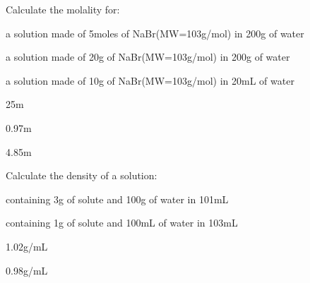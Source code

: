 \documentclass[main.tex]{subfiles}
\begin{document}
\begin{multicols*}{2}
\begin{question}[ID=\the\value{numA}]
Calculate the molality for: 
\begin{inparaenum}[(a)]
\item  a solution made of 5moles of NaBr(MW=103g/mol) in 200g of water %
\item  a solution made of 20g of NaBr(MW=103g/mol) in 200g of water %
\item  a solution made of 10g of NaBr(MW=103g/mol) in 20mL of water %
 \end{inparaenum}
\end{question}
\begin{solution}
\begin{inparaenum}[(a)]
\item    25m 
\item   0.97m 
\item   4.85m 
 \end{inparaenum}\hspace{0.1cm}\end{solution}%



\begin{question}[ID=\the\value{numA}]
Calculate the density of a solution: 
\begin{inparaenum}[(a)]
\item  containing 3g of solute and 100g of water in 101mL %
\item  containing 1g of solute and 100mL of water in 103mL %
 \end{inparaenum}
\end{question}
\begin{solution}
\begin{inparaenum}[(a)]
\item    1.02g/mL 
\item   0.98g/mL 
 \end{inparaenum}\hspace{0.1cm}\end{solution}%



\end{multicols*}
\end{document}
